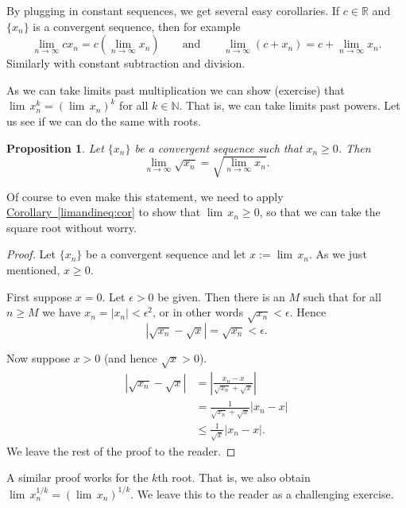 \documentclass[12pt]{book}
\newcommand{\abs}[1]{\left\lvert {#1} \right\rvert}
\newcommand{\R}{{\mathbb{R}}}
\newcommand{\N}{{\mathbb{N}}}
\theoremstyle{plain}
\newtheorem{prop}[thm]{Proposition}
\theoremstyle{remark}
\theoremstyle{definition}
\theoremstyle{exercise}
\theoremstyle{example}
\newcommand{\corref}[1]{\hyperref[#1]{Corollary~\ref*{#1}}}
\begin{document}
By plugging in constant sequences, we get several easy corollaries.
If $c \in \R$ and $\{ x_n \}$ is a convergent sequence, then
for example
\begin{equation*}
\lim_{n \to \infty} c x_n = 
c \left( \lim_{n \to \infty} x_n \right) \qquad
\text{and}
\qquad
\lim_{n \to \infty} (c + x_n) = 
c + \lim_{n \to \infty} x_n .
\end{equation*}
Similarly with constant subtraction and division.

As we can take limits past multiplication we can show (exercise)
that $\lim\, x_n^k = {(\lim\, x_n)}^k$ for all $k \in \N$.
That is, we can take limits
past powers.  Let us see if we can do the same with roots.

\begin{prop}
Let $\{ x_n \}$ be a convergent sequence such
that $x_n \geq 0$.
Then
\begin{equation*}
\lim_{n\to\infty} \sqrt{x_n} =
\sqrt{ \lim_{n\to\infty} x_n } .
\end{equation*}
\end{prop}

Of course to even make this statement, we need to apply
\corref{limandineq:cor} to show
that
$\lim\, x_n \geq 0$, so that we can take the square root without
worry.

\begin{proof}
Let $\{ x_n \}$ be a convergent sequence and let $x := \lim\, x_n$.
As we just mentioned, $x \geq 0$.

First suppose $x=0$.  Let $\epsilon > 0$ be given.
Then there is an $M$ such that for all $n \geq M$ we have
$x_n = \abs{x_n} < \epsilon^2$, or in other words $\sqrt{x_n} < \epsilon$.
Hence
\begin{equation*}
\abs{\sqrt{x_n} - \sqrt{x}} =
\sqrt{x_n} < \epsilon.
\end{equation*}

Now suppose $x > 0$ (and hence $\sqrt{x} > 0$).
\begin{equation*}
\begin{split}
\abs{\sqrt{x_n}-\sqrt{x}} &= 
\abs{\frac{x_n-x}{\sqrt{x_n}+\sqrt{x}}} \\
&=
\frac{1}{\sqrt{x_n}+\sqrt{x}}
\abs{x_n-x} \\
& \leq
\frac{1}{\sqrt{x}}
\abs{x_n-x} .
\end{split}
\end{equation*}
We leave the rest of the proof to the reader.
\end{proof}

A similar proof works for the $k$th root.  That is, we also
obtain
$\lim\, x_n^{1/k} = {( \lim\, x_n )}^{1/k}$.  We leave this to the reader
as a challenging exercise.
\end{document}
